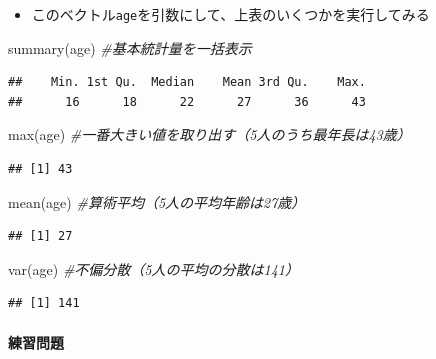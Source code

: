 \documentclass[
]{book}
\newenvironment{Shaded}{\begin{snugshade}}{\end{snugshade}}
\newcommand{\CommentTok}[1]{\textcolor[rgb]{0.56,0.35,0.01}{\textit{#1}}}
\newcommand{\FunctionTok}[1]{\textcolor[rgb]{0.00,0.00,0.00}{#1}}
\newcommand{\NormalTok}[1]{#1}
\providecommand{\tightlist}{%
  \setlength{\itemsep}{0pt}\setlength{\parskip}{0pt}}
\begin{document}
\begin{itemize}
\tightlist
\item
  このベクトル\texttt{age}を引数にして、上表のいくつかを実行してみる
\end{itemize}

\begin{Shaded}
\begin{Highlighting}[]
\FunctionTok{summary}\NormalTok{(age) }\CommentTok{\#基本統計量を一括表示}
\end{Highlighting}
\end{Shaded}

\begin{verbatim}
##    Min. 1st Qu.  Median    Mean 3rd Qu.    Max. 
##      16      18      22      27      36      43
\end{verbatim}

\begin{Shaded}
\begin{Highlighting}[]
\FunctionTok{max}\NormalTok{(age) }\CommentTok{\#一番大きい値を取り出す（5人のうち最年長は43歳）}
\end{Highlighting}
\end{Shaded}

\begin{verbatim}
## [1] 43
\end{verbatim}

\begin{Shaded}
\begin{Highlighting}[]
\FunctionTok{mean}\NormalTok{(age) }\CommentTok{\#算術平均（5人の平均年齢は27歳）}
\end{Highlighting}
\end{Shaded}

\begin{verbatim}
## [1] 27
\end{verbatim}

\begin{Shaded}
\begin{Highlighting}[]
\FunctionTok{var}\NormalTok{(age) }\CommentTok{\#不偏分散（5人の平均の分散は141）}
\end{Highlighting}
\end{Shaded}

\begin{verbatim}
## [1] 141
\end{verbatim}

\hypertarget{ux7df4ux7fd2ux554fux984c-4}{%
\paragraph*{練習問題}\label{ux7df4ux7fd2ux554fux984c-4}}
\end{document}
